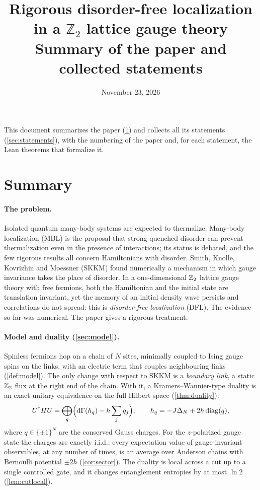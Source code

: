 \documentclass[11pt]{article}
\title{Rigorous disorder-free localization in a $\mathbb{Z}_2$ lattice gauge theory\\[8pt]
\large Summary of the paper and collected statements}
\author{}
\date{November 23, 2026}
\theoremstyle{stmtplain}
\theoremstyle{stmtdef}
\begin{document}
\maketitle

\noindent This document summarizes the paper (\cref{sec:summary}) and collects all its statements
(\cref{sec:statements}), with the numbering of the paper and, for each statement, the Lean theorems that
formalize it.

\tableofcontents

\section{Summary}\label{sec:summary}

\paragraph{The problem.}
Isolated quantum many-body systems are expected to thermalize. Many-body localization (MBL) is the proposal that
strong quenched disorder can prevent thermalization even in the presence of interactions; its status is debated, and
the few rigorous results all concern Hamiltonians with disorder. Smith, Knolle, Kovrizhin and Moessner (SKKM) found
numerically a mechanism in which gauge invariance takes the place of disorder. In a one-dimensional $\mathbb{Z}_2$ lattice
gauge theory with free fermions, both the Hamiltonian and the initial state are translation invariant, yet the memory
of an initial density wave persists and correlations do not spread: this is \emph{disorder-free localization} (DFL).
The evidence so far was numerical. The paper gives a rigorous treatment.

\paragraph{Model and duality (\cref{sec:model}).}
Spinless fermions hop on a chain of $N$ sites, minimally coupled to Ising gauge spins on the links, with an electric
term that couples neighbouring links (\cref{def:model}). The only change with respect to SKKM is a \emph{boundary
link}, a static $\mathbb{Z}_2$ flux at the right end of the chain. With it, a Kramers--Wannier-type duality is an exact
unitary equivalence on the full Hilbert space (\cref{thm:duality}):
\[
  U^\dagger HU=\bigoplus_q\Bigl(\mathrm{d}\Gamma(h_{q})-h\sum_jq_j\Bigr),\qquad h_{q}=-J\Delta_N+2h\operatorname{diag}(q),
\]
where $q\in\{\pm1\}^N$ are the conserved Gauss charges. For the $z$-polarized gauge state the charges are exactly
i.i.d.: every expectation value of gauge-invariant observables, at any number of times, is an average over Anderson
chains with Bernoulli potential $\pm2h$ (\cref{cor:sector}). The duality is local across a cut up to a single
controlled gate, and it changes entanglement entropies by at most $\ln2$ (\cref{lem:cutlocal}).
\end{document}
